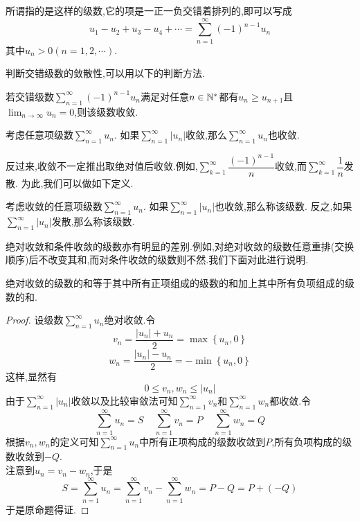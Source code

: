 \documentclass{ctexart}
\begin{document}
\pagestyle{empty}
\begin{center}\large{}\end{center}
\begin{definition}[1.1 定义:交错级数]
    所谓指的是这样的级数,它的项是一正一负交错着排列的,即可以写成
    \[u_1-u_2+u_3-u_4+\cdots=\sum_{n=1}^{\infty}\left(-1\right)^{n-1}u_n\]
    其中$u_n>0(n=1,2,\cdots)$.
\end{definition}\noindent
判断交错级数的敛散性,可以用以下的判断方法.
\begin{formal}[1.2 莱布尼茨判别法]
    若交错级数$\displaystyle\sum_{n=1}^{\infty}\left(-1\right)^{n-1}u_n$满足对任意$n\in\mathbb{N}^*$都有$u_n\geqslant u_{n+1}$且%
    $\displaystyle\lim_{n\to\infty}u_n=0$,则该级数收敛.
\end{formal}\noindent
{}
\begin{formal}[2.1 绝对值收敛推出收敛]
    考虑任意项级数$\displaystyle\sum_{n=1}^{\infty}u_n$.%
    如果$\displaystyle\sum_{n=1}^{\infty}\left|u_n\right|$收敛,那么$\displaystyle\sum_{n=1}^{\infty}u_n$也收敛.
\end{formal}\noindent
反过来,收敛不一定推出取绝对值后收敛.例如,$\displaystyle\sum_{k=1}^{\infty}\dfrac{(-1)^{n-1}}{n}$收敛,而$\displaystyle\sum_{k=1}^\infty\dfrac1n$发散.%
为此,我们可以做如下定义.
\begin{definition}[2.2 绝对收敛与条件收敛]
    考虑收敛的任意项级数$\displaystyle\sum_{n=1}^{\infty}u_n$.%
    如果$\displaystyle\sum_{n=1}^{\infty}\left|u_n\right|$也收敛,那么称该级数.%
    反之,如果$\displaystyle\sum_{n=1}^{\infty}\left|u_n\right|$发散,那么称该级数.
\end{definition}\noindent
绝对收敛和条件收敛的级数亦有明显的差别.例如,对绝对收敛的级数任意重排(交换顺序)后不改变其和,而对条件收敛的级数则不然.我们下面对此进行说明.
\begin{formal}[2.3 绝对收敛的级数的和]
    绝对收敛的级数的和等于其中所有正项组成的级数的和加上其中所有负项组成的级数的和.
\end{formal}
\begin{proof}
    设级数$\displaystyle\sum_{n=1}^{\infty}u_n$绝对收敛.令
    \[v_n=\dfrac{\left|u_n\right|+u_n}{2}=\max\left\{u_n,0\right\}\]
    \[w_n=\dfrac{\left|u_n\right|-u_n}{2}=-\min\left\{u_n,0\right\}\]
    这样,显然有
    \[0\leqslant v_n,w_n\leqslant\left|u_n\right|\]
    由于$\displaystyle\sum_{n=1}^{\infty}\left|u_n\right|$收敛以及比较审敛法可知$\displaystyle\sum_{n=1}^{\infty}v_n$和$\displaystyle\sum_{n=1}^{\infty}w_n$都收敛.令
    \[\sum_{n=1}^{\infty}u_n=S\ \ \ \ \ \sum_{n=1}^{\infty}v_n=P\ \ \ \ \ \sum_{n=1}^{\infty}w_n=Q\]
    根据$v_n,w_n$的定义可知$\displaystyle\sum_{n=1}^{\infty}u_n$中所有正项构成的级数收敛到$P$,所有负项构成的级数收敛到$-Q$.\\
    注意到$u_n=v_n-w_n$,于是
    \[S=\sum_{n=1}^{\infty}u_n=\sum_{n=1}^{\infty}v_n-\sum_{n=1}^{\infty}w_n=P-Q=P+(-Q)\]
    于是原命题得证.
\end{proof}
\end{document}
